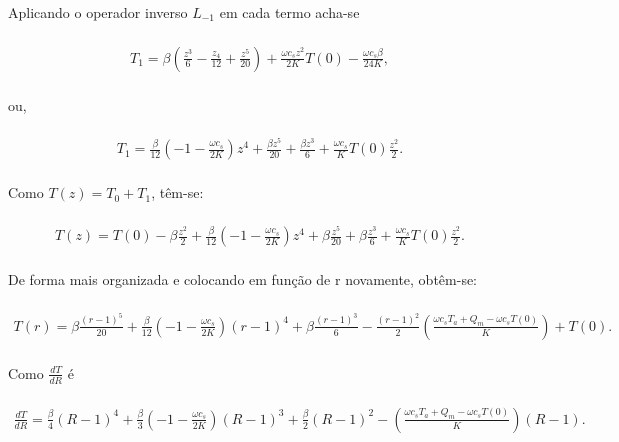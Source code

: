 Aplicando o operador inverso $L_{-1}$ em cada termo acha-se

\begin{gather} \nonumber\\
T_{1} = \beta \left(\frac{z^{3}}{6} - \frac{z_{4}}{12} + \frac{z^{5}}{20}\right) +  \frac{\omega c_{s}z^{2}}{2K} T(0) - \frac{\omega c_{s}\beta}{24K},
\nonumber\\\end{gather}

ou,

\begin{gather} \nonumber\\
T_{1} = \frac{\beta}{12} \left(-1 - \frac{\omega c_{s}}{2K}\right)z^{4} +  \frac{\beta z^{5}}{20} + \frac{\beta z^{3}}{6} + \frac{\omega c_{s}}{K}T(0)\frac{z^{2}}{2}.
\nonumber\\\end{gather}

Como $T(z) = T_{0} + T_{1}$, têm-se:


\begin{gather} \nonumber\\
T(z) = T(0) - \beta \frac{z^{2}}{2} + \frac{\beta}{12}\left( -1 - \frac{\omega c_{s}}{2K}\right) z^{4} + \beta\frac{z^{5}}{20} + \beta\frac{z^{3}}{6} + \frac{\omega c_{s}}{K} T(0)\frac{z^2}{2}.
\nonumber\\\end{gather}

De forma mais organizada e colocando em função de r novamente, obtêm-se:

\begin{gather} \nonumber\\
T(r) = \beta \frac{(r-1)^{5}}{20} + \frac{\beta}{12}\left( -1 - \frac{\omega c_{s}}{2K}\right)( r-1)^{4} + \beta\frac{(r-1)^{3}}{6} - \frac{(r-1)^{2}}{2}\left(\frac{\omega c_{s} T_{a} + Q_{m} - \omega c_{s} T(0)}{K}\right) + T(0).
\nonumber\\\end{gather}

Como $\frac{dT}{dR}$ é

\begin{gather} \nonumber\\
\frac{dT}{dR} = \frac{\beta}{4}(R-1)^{4} + \frac{\beta}{3}\left(-1-\frac{\omega c_{s}}{2K}\right)(R-1)^{3} + \frac{\beta}{2} (R-1)^{2} - \left(\frac{\omega c_{s} T_{a} + Q_{m} - \omega c_{s} T(0)}{K}\right)(R-1).
\nonumber\\\end{gather}

